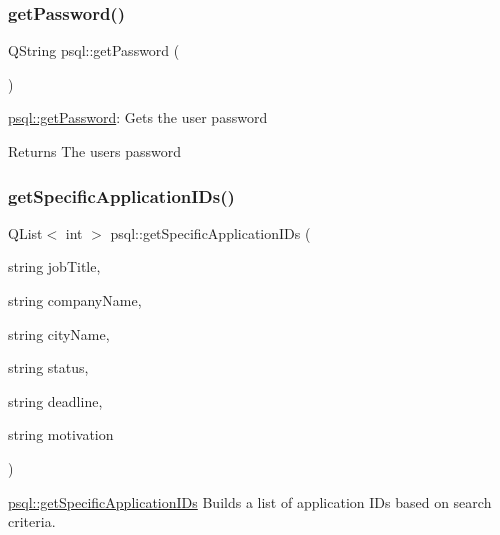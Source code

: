 \subsubsection{\texorpdfstring{get\+Password()}{getPassword()}}
{\footnotesize\ttfamily Q\+String psql\+::get\+Password (\begin{DoxyParamCaption}{ }\end{DoxyParamCaption})}



\mbox{\hyperlink{classpsql_a817e5a88f877cac6f843c1e743aec096}{psql\+::get\+Password}}\+: Gets the user password 

\begin{DoxyReturn}{Returns}
The user\textquotesingle{}s password 
\end{DoxyReturn}
\mbox{\label{classpsql_ab6edb8a2e42d8ac7c4ae29f5b0cb494f}} 
\subsubsection{\texorpdfstring{get\+Specific\+Application\+I\+Ds()}{getSpecificApplicationIDs()}}
{\footnotesize\ttfamily Q\+List$<$ int $>$ psql\+::get\+Specific\+Application\+I\+Ds (\begin{DoxyParamCaption}\item[{string}]{job\+Title,  }\item[{string}]{company\+Name,  }\item[{string}]{city\+Name,  }\item[{string}]{status,  }\item[{string}]{deadline,  }\item[{string}]{motivation }\end{DoxyParamCaption})}



\mbox{\hyperlink{classpsql_ab6edb8a2e42d8ac7c4ae29f5b0cb494f}{psql\+::get\+Specific\+Application\+I\+Ds}} Builds a list of application I\+Ds based on search criteria. 


